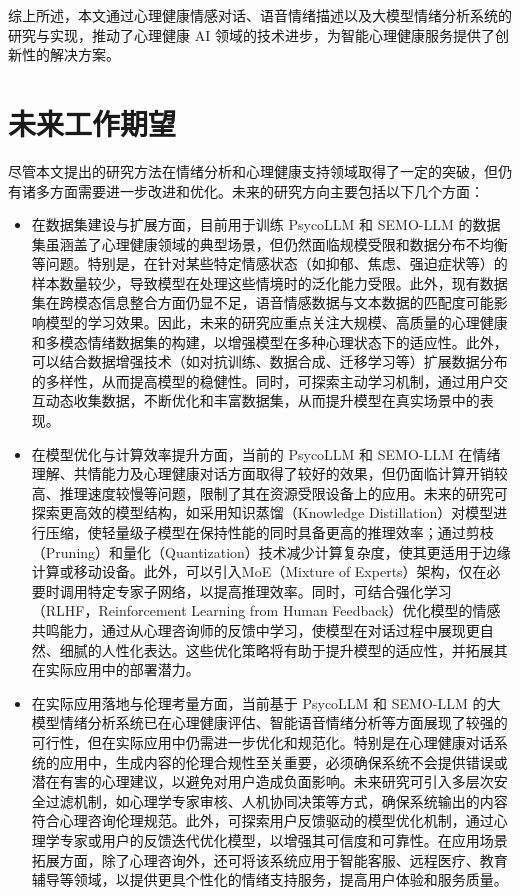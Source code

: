 综上所述，本文通过心理健康情感对话、语音情绪描述以及大模型情绪分析系统的研究与实现，推动了心理健康 AI 领域的技术进步，为智能心理健康服务提供了创新性的解决方案。

\section{未来工作期望}

尽管本文提出的研究方法在情绪分析和心理健康支持领域取得了一定的突破，但仍有诸多方面需要进一步改进和优化。未来的研究方向主要包括以下几个方面：

\begin{itemize}
  \item 在数据集建设与扩展方面，目前用于训练 PsycoLLM 和 SEMO-LLM 的数据集虽涵盖了心理健康领域的典型场景，但仍然面临规模受限和数据分布不均衡等问题。特别是，在针对某些特定情感状态（如抑郁、焦虑、强迫症状等）的样本数量较少，导致模型在处理这些情境时的泛化能力受限。此外，现有数据集在跨模态信息整合方面仍显不足，语音情感数据与文本数据的匹配度可能影响模型的学习效果。因此，未来的研究应重点关注大规模、高质量的心理健康和多模态情绪数据集的构建，以增强模型在多种心理状态下的适应性。此外，可以结合数据增强技术（如对抗训练、数据合成、迁移学习等）扩展数据分布的多样性，从而提高模型的稳健性。同时，可探索主动学习机制，通过用户交互动态收集数据，不断优化和丰富数据集，从而提升模型在真实场景中的表现。
  \item 在模型优化与计算效率提升方面，当前的 PsycoLLM 和 SEMO-LLM 在情绪理解、共情能力及心理健康对话方面取得了较好的效果，但仍面临计算开销较高、推理速度较慢等问题，限制了其在资源受限设备上的应用。未来的研究可探索更高效的模型结构，如采用知识蒸馏（Knowledge Distillation）对模型进行压缩，使轻量级子模型在保持性能的同时具备更高的推理效率；通过剪枝（Pruning）和量化（Quantization）技术减少计算复杂度，使其更适用于边缘计算或移动设备。此外，可以引入MoE（Mixture of Experts）架构，仅在必要时调用特定专家子网络，以提高推理效率。同时，可结合强化学习（RLHF，Reinforcement Learning from Human Feedback）优化模型的情感共鸣能力，通过从心理咨询师的反馈中学习，使模型在对话过程中展现更自然、细腻的人性化表达。这些优化策略将有助于提升模型的适应性，并拓展其在实际应用中的部署潜力。
  \item 在实际应用落地与伦理考量方面，当前基于 PsycoLLM 和 SEMO-LLM 的大模型情绪分析系统已在心理健康评估、智能语音情绪分析等方面展现了较强的可行性，但在实际应用中仍需进一步优化和规范化。特别是在心理健康对话系统的应用中，生成内容的伦理合规性至关重要，必须确保系统不会提供错误或潜在有害的心理建议，以避免对用户造成负面影响。未来研究可引入多层次安全过滤机制，如心理学专家审核、人机协同决策等方式，确保系统输出的内容符合心理咨询伦理规范。此外，可探索用户反馈驱动的模型优化机制，通过心理学专家或用户的反馈迭代优化模型，以增强其可信度和可靠性。在应用场景拓展方面，除了心理咨询外，还可将该系统应用于智能客服、远程医疗、教育辅导等领域，以提供更具个性化的情绪支持服务，提高用户体验和服务质量。

\end{itemize}
